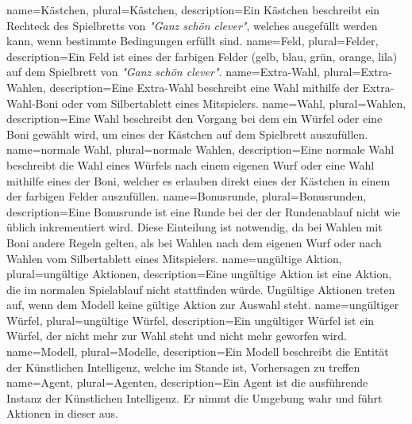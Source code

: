 {
	name=Kästchen,
	plural=Kästchen,
	description={Ein Kästchen beschreibt ein Rechteck des Spielbretts von \textit{"Ganz schön clever"}, welches ausgefüllt werden kann, wenn bestimmte Bedingungen erfüllt sind.}
}
{
	name=Feld,
	plural=Felder,
	description={Ein Feld ist eines der farbigen Felder (gelb, blau, grün, orange, lila) auf dem Spielbrett von \textit{"Ganz schön clever"}.}
}
{
	name=Extra-Wahl,
	plural=Extra-Wahlen,
	description={Eine Extra-Wahl beschreibt eine Wahl mithilfe der Extra-Wahl-Boni oder vom Silbertablett eines Mitspielers.}
}
{
	name=Wahl,
	plural=Wahlen,
	description={Eine Wahl beschreibt den Vorgang bei dem ein Würfel oder eine Boni gewählt wird, um eines der Kästchen auf dem Spielbrett auszufüllen.\newpage}
}
{
	name=normale Wahl,
	plural=normale Wahlen,
	description={Eine normale Wahl beschreibt die Wahl eines Würfels nach einem eigenen Wurf oder eine Wahl mithilfe eines der Boni, welcher es erlauben direkt eines der Kästchen in einem der farbigen Felder auszufüllen.}
}
{
	name=Bonusrunde,
	plural=Bonusrunden,
	description={Eine Bonusrunde ist eine Runde bei der der Rundenablauf nicht wie üblich inkrementiert wird. Diese Einteilung ist notwendig, da bei Wahlen mit Boni andere Regeln gelten, als bei Wahlen nach dem eigenen Wurf oder nach Wahlen vom Silbertablett eines Mitspielers.}
}
{
	name=ungültige Aktion,
	plural=ungültige Aktionen,
	description={Eine ungültige Aktion ist eine Aktion, die im normalen Spielablauf nicht stattfinden würde. Ungültige Aktionen treten auf, wenn dem Modell keine gültige Aktion zur Auswahl steht.}
}
{
	name=ungültiger Würfel,
	plural=ungültige Würfel,
	description={Ein ungültiger Würfel ist ein Würfel, der nicht mehr zur Wahl steht und nicht mehr geworfen wird.}
}
{
	name=Modell,
	plural=Modelle,
	description={Ein Modell beschreibt die Entität der Künstlichen Intelligenz, welche im Stande ist, Vorhersagen zu treffen}
}
{
	name=Agent,
	plural=Agenten,
	description={Ein Agent ist die ausführende Instanz der Künstlichen Intelligenz. Er nimmt die Umgebung wahr und führt Aktionen in dieser aus.}
}